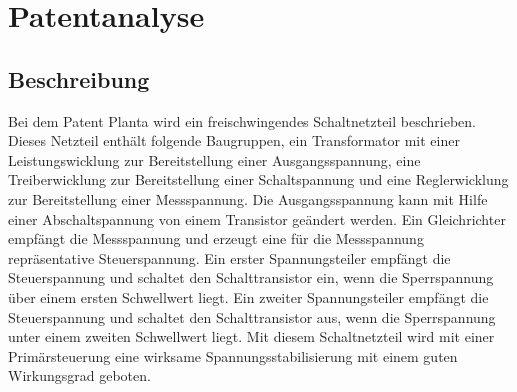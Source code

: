 \section{Patentanalyse}\label{sec:Patentanalyse}
\subsection{Beschreibung}\label{subsec:Beschreibung}
Bei dem Patent Planta wird ein freischwingendes Schaltnetzteil beschrieben. Dieses Netzteil enthält folgende Baugruppen, ein Transformator mit einer Leistungswicklung zur Bereitstellung einer Ausgangsspannung, eine Treiberwicklung zur Bereitstellung einer Schaltspannung und eine Reglerwicklung zur Bereitstellung einer Messspannung. Die Ausgangsspannung kann mit Hilfe einer Abschaltspannung von einem Transistor geändert werden. Ein Gleichrichter empfängt die Messspannung und erzeugt eine für die Messspannung repräsentative Steuerspannung. Ein erster Spannungsteiler empfängt die Steuerspannung und schaltet den Schalttransistor ein, wenn die Sperrspannung über einem ersten Schwellwert liegt. Ein zweiter Spannungsteiler empfängt die Steuerspannung und schaltet den Schalttransistor aus, wenn die Sperrspannung unter einem zweiten Schwellwert liegt. Mit diesem Schaltnetzteil wird mit einer Primärsteuerung eine wirksame Spannungsstabilisierung mit einem guten Wirkungsgrad geboten.


